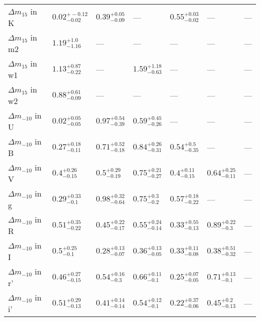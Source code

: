 \begin{tabular}{lllllll}
${\Delta m}_{15}$ in K   &   $0.02_{-0.02}^{+-0.12}$ &  $0.39_{-0.09}^{+0.05}$ &                     --- &  $0.55_{-0.02}^{+0.03}$ &                     --- &                     --- \\
${\Delta m}_{15}$ in m2  &     $1.19_{-1.16}^{+1.0}$ &                     --- &                     --- &                     --- &                     --- &                     --- \\
${\Delta m}_{15}$ in w1  &    $1.13_{-0.22}^{+0.87}$ &                     --- &  $1.59_{-0.63}^{+1.18}$ &                     --- &                     --- &                     --- \\
${\Delta m}_{15}$ in w2  &    $0.88_{-0.09}^{+0.61}$ &                     --- &                     --- &                     --- &                     --- &                     --- \\
${\Delta m}_{-10}$ in U  &    $0.02_{-0.05}^{+0.05}$ &  $0.97_{-0.39}^{+0.54}$ &  $0.59_{-0.26}^{+0.45}$ &                     --- &                     --- &                     --- \\
${\Delta m}_{-10}$ in B  &    $0.27_{-0.11}^{+0.18}$ &  $0.71_{-0.18}^{+0.52}$ &  $0.84_{-0.31}^{+0.26}$ &   $0.54_{-0.35}^{+0.5}$ &                     --- &                     --- \\
${\Delta m}_{-10}$ in V  &     $0.4_{-0.15}^{+0.26}$ &   $0.5_{-0.19}^{+0.29}$ &  $0.75_{-0.27}^{+0.21}$ &   $0.4_{-0.15}^{+0.11}$ &  $0.64_{-0.11}^{+0.25}$ &                     --- \\
${\Delta m}_{-10}$ in g  &     $0.29_{-0.1}^{+0.33}$ &  $0.98_{-0.64}^{+0.32}$ &    $0.75_{-0.2}^{+0.3}$ &  $0.57_{-0.22}^{+0.18}$ &                     --- &                     --- \\
${\Delta m}_{-10}$ in R  &    $0.51_{-0.22}^{+0.35}$ &  $0.45_{-0.17}^{+0.22}$ &  $0.55_{-0.14}^{+0.24}$ &  $0.33_{-0.13}^{+0.55}$ &   $0.89_{-0.3}^{+0.22}$ &                     --- \\
${\Delta m}_{-10}$ in I  &      $0.5_{-0.1}^{+0.25}$ &  $0.28_{-0.07}^{+0.13}$ &  $0.36_{-0.05}^{+0.13}$ &  $0.33_{-0.08}^{+0.11}$ &  $0.38_{-0.32}^{+0.51}$ &                     --- \\
${\Delta m}_{-10}$ in r' &    $0.46_{-0.15}^{+0.27}$ &   $0.54_{-0.3}^{+0.16}$ &   $0.66_{-0.1}^{+0.11}$ &  $0.25_{-0.05}^{+0.07}$ &   $0.71_{-0.1}^{+0.13}$ &                     --- \\
${\Delta m}_{-10}$ in i' &    $0.51_{-0.13}^{+0.29}$ &  $0.41_{-0.14}^{+0.14}$ &   $0.54_{-0.1}^{+0.12}$ &  $0.22_{-0.06}^{+0.37}$ &   $0.45_{-0.13}^{+0.2}$ &                     --- \\

\end{tabular}
